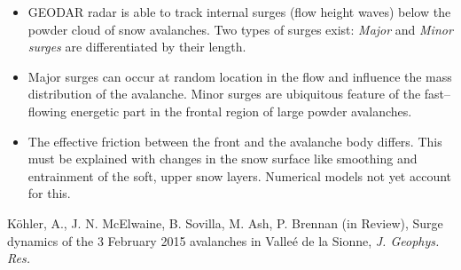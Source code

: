 \documentclass[unknownkeysallowed,usepdftitle=false]{beamer}
\newcommand{\secvariable}{nothing}
\newcommand{\mysection}[1]{\renewcommand{\secvariable}{#1}
}
\begin{document}
\mysection{conclusion}
\begin{frame}\label{\secvariable}
  
  \begin{itemize}
   \item GEODAR radar is able to track internal surges (flow height waves)
below the powder cloud of snow avalanches.
   Two types of surges exist: \textit{Major} and \textit{Minor surges} are
differentiated by their length.
  \item Major surges can occur at random location in the flow and influence the
mass distribution of the avalanche.
   Minor surges are ubiquitous feature of the fast--flowing energetic
part in the frontal region of large powder avalanches. 
  \item The effective friction between the front and the avalanche body
differs. This must be explained with changes in the snow surface like smoothing
and entrainment of the soft, upper snow layers. Numerical models not yet account for this.

  \end{itemize}

  K\"ohler, A., J. N. McElwaine, B. Sovilla, M. Ash, P. Brennan (in Review),
Surge dynamics of the 3 February 2015 avalanches in Valle\'e de la Sionne,
\textit{J. Geophys. Res.} 
  
\end{frame}
\end{document}
